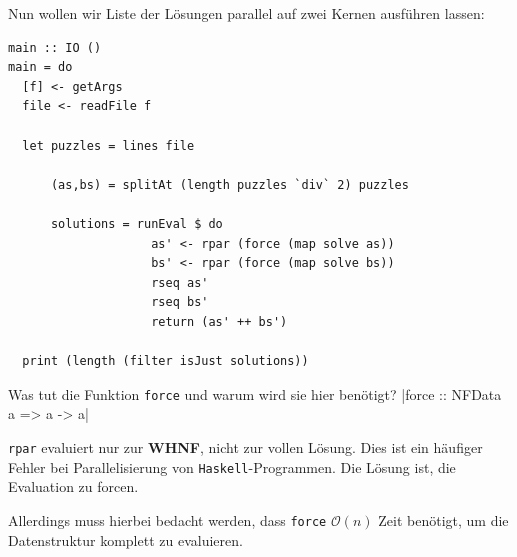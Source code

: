 \documentclass{beamer}
\begin{document}

\begin{frame}[fragile]
Nun wollen wir Liste der Lösungen parallel auf zwei Kernen ausführen lassen:

\begin{verbatim}
main :: IO ()
main = do
  [f] <- getArgs
  file <- readFile f

  let puzzles = lines file

      (as,bs) = splitAt (length puzzles `div` 2) puzzles

      solutions = runEval $ do
                    as' <- rpar (force (map solve as))
                    bs' <- rpar (force (map solve bs))
                    rseq as'
                    rseq bs'
                    return (as' ++ bs')

  print (length (filter isJust solutions))
\end{verbatim}
\end{frame}


\begin{frame}[fragile]

Was tut die Funktion \texttt{force} und warum wird sie hier benötigt?
|force :: NFData a => a -> a|
\pause
\bigskip

\texttt{rpar} evaluiert nur zur \textbf{WHNF}, nicht zur vollen Lösung. Dies ist ein häufiger Fehler bei Parallelisierung von \texttt{Haskell}-Programmen. Die Lösung ist, die Evaluation zu forcen.
\pause
\bigskip

Allerdings muss hierbei bedacht werden, dass \texttt{force} $\mathcal{O}(n)$ Zeit benötigt, um die Datenstruktur komplett zu evaluieren.
\end{frame}

\end{document}
